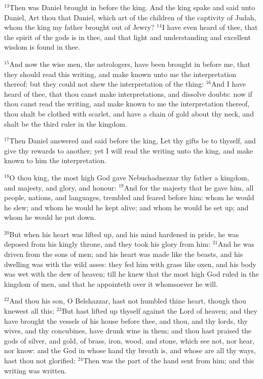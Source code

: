 \documentclass[12pt]{article}
\begin{document}
$^{13}$Then was Daniel brought in before the king. And the king spake
and said unto Daniel, Art thou that Daniel, which art of the children
of the captivity of Judah, whom the king my father brought out of
Jewry?  $^{14}$I have even heard of thee, that the spirit of the gods is
in thee, and that light and understanding and excellent wisdom is
found in thee.


$^{15}$And now the wise men, the astrologers, have been brought in
before me, that they should read this writing, and make known unto me
the interpretation thereof: but they could not shew the interpretation
of the thing: $^{16}$And I have heard of thee, that thou canst make
interpretations, and dissolve doubts: now if thou canst read the
writing, and make known to me the interpretation thereof, thou shalt
be clothed with scarlet, and have a chain of gold about thy neck, and
shalt be the third ruler in the kingdom.


$^{17}$Then Daniel answered and said before the king, Let thy gifts be
to thyself, and give thy rewards to another; yet I will read the
writing unto the king, and make known to him the interpretation.


$^{18}$O thou king, the most high God gave Nebuchadnezzar thy father a
kingdom, and majesty, and glory, and honour: $^{19}$And for the majesty
that he gave him, all people, nations, and languages, trembled and
feared before him: whom he would he slew; and whom he would he kept
alive; and whom he would he set up; and whom he would he put down.


$^{20}$But when his heart was lifted up, and his mind hardened in pride,
he was deposed from his kingly throne, and they took his glory from
him: $^{21}$And he was driven from the sons of men; and his heart was
made like the beasts, and his dwelling was with the wild asses: they
fed him with grass like oxen, and his body was wet with the dew of
heaven; till he knew that the most high God ruled in the kingdom of
men, and that he appointeth over it whomsoever he will.


$^{22}$And thou his son, O Belshazzar, hast not humbled thine heart,
though thou knewest all this; $^{23}$But hast lifted up thyself against
the Lord of heaven; and they have brought the vessels of his house
before thee, and thou, and thy lords, thy wives, and thy concubines,
have drunk wine in them; and thou hast praised the gods of silver, and
gold, of brass, iron, wood, and stone, which see not, nor hear, nor
know: and the God in whose hand thy breath is, and whose are all thy
ways, hast thou not glorified: $^{24}$Then was the part of the hand sent
from him; and this writing was written.
\end{document}
